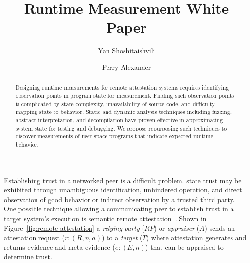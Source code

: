 \documentclass[runningheads]{llncs}
\begin{document}
%
\title{Runtime Measurement White Paper}
%
%
\author{Yan Shoshitaishvili \and Perry Alexander}
%
%
%
\maketitle              %
%
\begin{abstract}
  Designing runtime measurements for remote attestation systems
  requires identifying observation points in program state for
  measurement.  Finding such observation points is complicated by
  state complexity, unavailability of source code, and difficulty
  mapping state to behavior.  Static and dynamic analysis techniques
  including fuzzing, abstract interpretation, and decompilation have
  proven effective in approximating system state for testing and
  debugging.  We propose repurposing such techniques to discover
  measurements of user-space programs that indicate expected runtime
  behavior.
  
  
\end{abstract}
%
%
%


Establishing trust in a networked peer is a difficult problem. \citet{Martin:08:The-ten-page-in} state trust may be exhibited through unambiguous identification, unhindered operation, and direct observation of good behavior or indirect observation by a trusted third party. One possible technique allowing a communicating peer to establish trust in a target system's execution is semantic remote attestation~\citep{Haldar:04:Semantic-Remote}. Shown in Figure~\ref{fig:remote-attestation} a \emph{relying party} ($RP$) or \emph{appraiser} ($A$) sends an attestation request ($r:(R,n,a)$) to a \emph{target} ($T$) where attestation generates and returns evidence
and meta-evidence ($e:(E,n)$) that can be appraised to determine
trust. 
\end{document}
